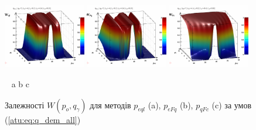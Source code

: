 \begin{figure}[htb!]
  \begin{center}
    \includegraphics[width=0.32\textwidth]{p/qls_pe-p_po_qg_Wql_all.png}
    \hfill
    \includegraphics[width=0.32\textwidth]{p/qls_pe-p_po_qg_WFq_all.png}
    \hfill
    \includegraphics[width=0.32\textwidth]{p/qls_pe-p_po_qg_WFc_all.png}
  \end{center}
  \vspace{-1.0ex}
  \begin{center}
    ~ \hfill a \hfill\hfill b \hfill\hfill c \hfill ~
  \end{center}
  \vspace{-1.5ex}
  \caption{Залежності $W(p_o,q_\gamma)$ для методів $p_{eql}$ (a), $p_{eFq}$ (b), $p_{qFc}$ (c) за умов (\ref{atu:eq:q_dem_all})}
  \label{atu:f:qsl_W_po_qg_all}
\end{figure}


